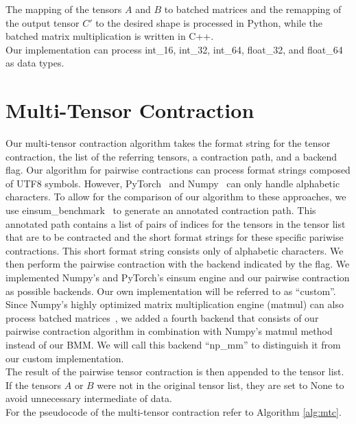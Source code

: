 \noindent The mapping of the tensors $A$ and $B$ to batched matrices and the remapping of the output tensor $C'$ to the desired shape is processed in Python, while the batched matrix multiplication is written in C++. \\
Our implementation can process int\_16, int\_32, int\_64, float\_32, and float\_64 as data types.


\section{Multi-Tensor Contraction}
Our multi-tensor contraction algorithm takes the format string for the tensor contraction, the list of the referring tensors, a contraction path, and a backend flag. Our algorithm for pairwise contractions can process format strings composed of UTF8 symbols. However, PyTorch~\cite{PyTorch} and Numpy~\cite{Numpy} can only handle alphabetic characters. 
To allow for the comparison of our algorithm to these approaches, we use einsum\_benchmark~\cite{blacher2024einsum} to generate an annotated contraction path. This annotated path contains a list of pairs of indices for the tensors in the tensor list that are to be contracted and the short format strings for these specific pariwise contractions. 
This short format string consists only of alphabetic characters. We then perform the pairwise contraction with the backend indicated by the flag. 
We implemented Numpy's and PyTorch's einsum engine and our pairwise contraction as possible backends. Our own implementation will be referred to as ``custom''. Since Numpy's highly optimized matrix multiplication engine (matmul) can also process batched matrices~\cite{Numpy}, we added a fourth backend that consists of our pairwise contraction algorithm in combination with Numpy's matmul method instead of our BMM. We will call this backend ``np\_mm'' to distinguish it from our custom implementation. \\
The result of the pairwise tensor contraction is then appended to the tensor list. If the tensors $A$ or $B$ were not in the original tensor list, they are set to None to avoid unnecessary intermediate of data.\\
For the pseudocode of the multi-tensor contraction refer to Algorithm \ref{alg:mtc}.

